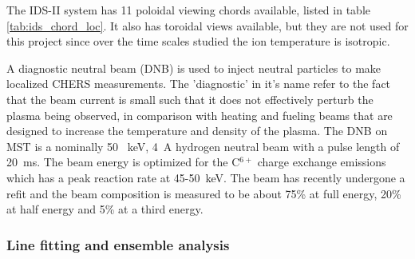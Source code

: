 The IDS-II system has 11 poloidal viewing chords available, listed in table \ref{tab:ids_chord_loc}. It also has toroidal views available, but they are not used for this project since over the time scales studied the ion temperature is isotropic. 

A diagnostic neutral beam (DNB) is used to inject neutral particles to make localized CHERS measurements. The 'diagnostic' in it's name refer to the fact that the beam current is small such that it does not effectively perturb the plasma being observed, in comparison with heating and fueling beams that are designed to increase the temperature and density of the plasma. The DNB on MST is a nominally 50 ~keV, 4~A hydrogen neutral beam with a pulse length of 20~ms\cite{Feng2016}. The beam energy is optimized for the C$^{6+}$ charge exchange emissions which has a peak reaction rate at 45-50~keV. The beam has recently undergone a refit and the beam composition is measured to be about 75\% at full energy, 20\% at half energy and 5\% at a third energy.\cite{Feng2016}

\subsubsection{Line fitting and ensemble analysis}



